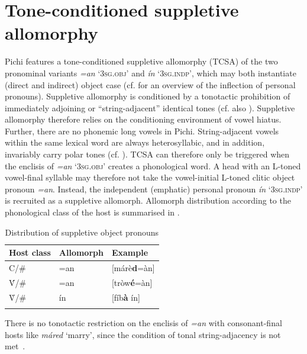 \section{Tone-conditioned suppletive allomorphy}\label{sec:3.3}

Pichi features a tone-conditioned suppletive allomorphy (TCSA) of the two pronominal variants \textit{=an} \textsc{‘3sg.obj’} and \textit{ín} ‘\textsc{3sg.indp’}, which may both instantiate (direct and indirect) object case (cf.  for an overview of the inflection of personal pronouns). Suppletive allomorphy is conditioned by a tonotactic prohibition of immediately adjoining or “string-adjacent” \citep{Suzuki1998} identical tones (cf. also ). Suppletive allomorphy therefore relies on the conditioning environment of vowel hiatus. Further, there are no phonemic long vowels in Pichi. String-adjacent vowels within the same lexical word are always heterosyllabic, and in addition, invariably carry polar tones (cf. ). TCSA can therefore only be triggered when the enclisis of \textit{=an} \textsc{‘3sg.obj’} creates a phonological word. A head with an L-toned vowel-final syllable may therefore not take the vowel-initial L-toned clitic object pronoun \textit{=an}. Instead, the independent (emphatic) personal pronoun \textit{ín} \textsc{‘3sg.indp’} is recruited as a suppletive allomorph. Allomorph distribution according to the phonological class of the host is summarised in .

\begin{table}
\caption{Distribution of suppletive object pronouns}
\label{tab:key:3.4}

\begin{tabularx}{.8\textwidth}{XXl}
\lsptoprule
{Host class} & {Allomorph} & {Example}\\
\midrule
C/{\longrule}\# & =an & [márè\textbf{d}=àn]\\
\'{V}/{\longrule}\# & =an & [tròw\textbf{é}=àn]\\
\`{V}/{\longrule}\# & ín & [fíb\textbf{à} ín]\\
\lspbottomrule
\end{tabularx}
\end{table}

There is no tonotactic restriction on the enclisis of \textit{=an} with consonant-final hosts like \textit{máred} ‘marry’, since the condition of tonal string-adjacency is not met~.


